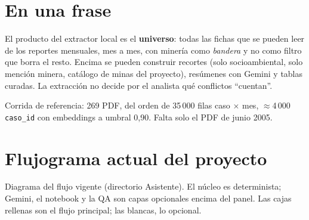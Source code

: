 \documentclass[11pt,a4paper]{article}
\begin{document}
\tableofcontents
\newpage

\section{En una frase}

El producto del extractor local es el \textbf{universo}: todas las fichas que se pueden leer de los reportes mensuales, mes a mes, con minería como \emph{bandera} y no como filtro que borra el resto. Encima se pueden construir recortes (solo socioambiental, solo mención minera, catálogo de minas del proyecto), resúmenes con Gemini y tablas curadas. La extracción no decide por el analista qué conflictos ``cuentan''.

Corrida de referencia: 269 PDF, del orden de 35\,000 filas caso $\times$ mes, $\approx$4\,000 \texttt{caso\_id} con embeddings a umbral 0{,}90. Falta solo el PDF de junio 2005.

\section{Flujograma actual del proyecto}

Diagrama del flujo vigente (directorio Asistente). El núcleo es determinista; Gemini, el notebook y la QA son capas opcionales encima del panel. Las cajas rellenas son el flujo principal; las blancas, lo opcional.
\end{document}
